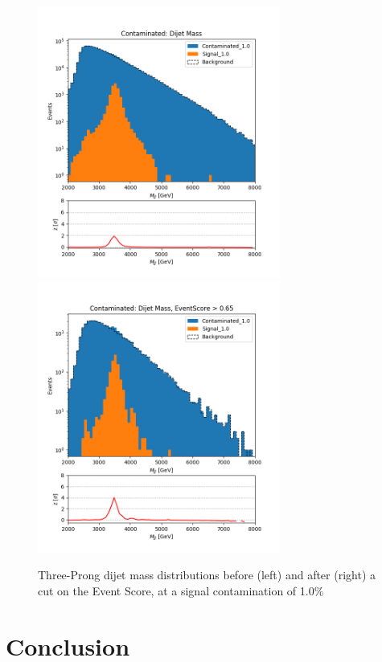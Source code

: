 \documentclass[12pt, a4paper]{article}
\begin{document}
\begin{figure}[H]
	\begin{center}
		\includegraphics[width=225pt]{imgs/3Prong_Contaminated_1p0_JJ_Mass_Multi.png}
		\includegraphics[width=225pt]{imgs/3Prong_Contaminated_1p0_JJ_Mass_EventScore0p65_Multi.png}
	\end{center}
	\caption{Three-Prong dijet mass distributions before (left) and after (right) a cut on the Event Score, at a signal contamination of 1.0\%}
	\label{fig:3p_dijet}
\end{figure}




\section*{Conclusion}
\end{document}
